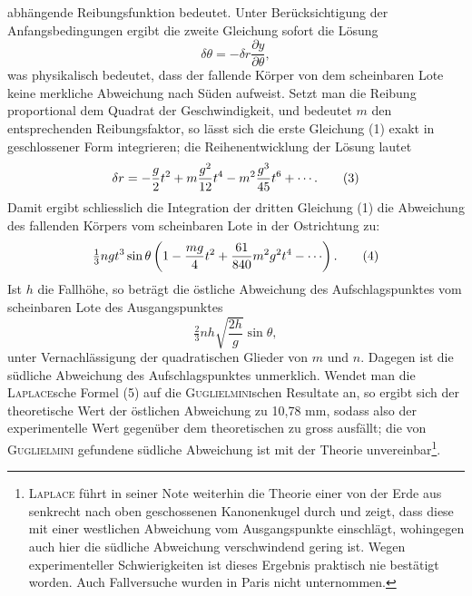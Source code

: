 abhängende Reibungsfunktion bedeutet. Unter Berücksichtigung der Anfangsbedingungen
ergibt die zweite Gleichung sofort die Lösung
\[
\delta\theta=-\delta r\frac{\partial y}{\partial\theta},\tag{2}
\]
\noindent was physikalisch bedeutet, dass der fallende Körper von dem scheinbaren Lote
keine merkliche Abweichung nach Süden aufweist. Setzt man die Reibung
proportional dem Quadrat der Geschwindigkeit, und bedeutet $m$ den entsprechenden
Reibungsfaktor, so lässt sich die erste Gleichung (1) exakt in
geschlossener Form integrieren; die Reihenentwicklung der Lösung lautet
\[
\delta r=-\frac{g}{2}t^2+m\frac{g^2}{12}t^4-m^2\frac{g^3}{45}t^6+\mathinner{\cdotp\cdotp\cdotp}.\tag{3}
\]
\noindent Damit ergibt schliesslich die Integration der dritten Gleichung (1) die Abweichung
des fallenden Körpers vom scheinbaren Lote in der Ostrichtung zu:
\[
\tfrac{1}{3}ngt^3\sin\theta\left(1-\frac{mg}{4}t^2+\frac{61}{840}m^2g^2t^4-\mathinner{\cdotp\cdotp\cdotp}\right).\tag{4}
\]
\noindent Ist $h$ die Fallhöhe, so beträgt die östliche Abweichung des Aufschlagspunktes
vom scheinbaren Lote des Ausgangspunktes
\[
\tfrac{2}{3}nh\sqrt{\frac{2h}{g}}\sin\theta,\tag{5}
\]
\noindent unter Vernachlässigung der quadratischen Glieder von $m$ und $n$. Dagegen
ist die südliche Abweichung des Aufschlagspunktes unmerklich.
\clearpage{}
\noindent\hspace*{\parindent}Wendet man die \textsc{Laplace}sche Formel (5) auf die \textsc{Guglielmini}schen Resultate
an, so ergibt sich der theoretische Wert der östlichen Abweichung zu
10,78 mm, sodass also der experimentelle Wert gegenüber dem theoretischen
zu gross ausfällt; die von \textsc{Guglielmini} gefundene südliche Abweichung ist mit
der Theorie unvereinbar\footnote{\textsc{Laplace} führt in seiner Note weiterhin die Theorie einer von der Erde aus senkrecht nach oben
geschossenen Kanonenkugel durch und zeigt, dass diese mit einer westlichen Abweichung vom Ausgangspunkte
einschlägt, wohingegen auch hier die südliche Abweichung verschwindend gering ist. Wegen experimenteller
Schwierigkeiten ist dieses Ergebnis praktisch nie bestätigt worden. Auch Fallversuche wurden
in Paris nicht unternommen.}.

